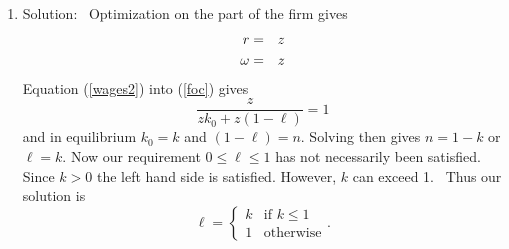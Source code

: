 \documentclass[11pt]{article}
\begin{document}
\begin{enumerate}
\begin{enumerate}
so 
\begin{eqnarray*}
\ell &=&\gamma \\
k &=&k_{0} \\
c &=&y=zk^{\gamma }n^{1-\gamma } \\
\omega &=&z\left( 1-\gamma \right) \left( \frac{k}{n}\right) ^{\gamma } \\
r &=&z\gamma \left( \frac{n}{k}\right) ^{1-\gamma }
\end{eqnarray*}%
There are a couple of things to notice. First, we have solved for every item
that the definition calls for. Second, in listing $\ell $ through $r$ we
have done it in such a way that the expressions include no terms that have
not previously been defined in terms of the model's parameters. Third, we
have one constraint that we have not yet dealt with, $0\leq \ell \leq 1.$
However since $0<\gamma <1$ this is satisfied. \ Finally, we are sloppy here
in that we ignore second or conditions. (Are these solutions maximums or
minimums?) You can always ignore second order conditions when not explicitly
asked for. However, be aware that they are required to actually be rigorous.

\item Solution: \ Optimization on the part of the firm gives 
\begin{eqnarray}
r &=&z  \label{wages2} \\
\omega &=&z  \notag
\end{eqnarray}%
Equation (\ref{wages2}) into (\ref{foc}) gives 
\begin{equation*}
\frac{z}{zk_{0}+z\left( 1-\ell \right) }=1
\end{equation*}%
and in equilibrium $k_{0}=k$ and $\left( 1-\ell \right) =n$. Solving then
gives $n=1-k$ or $\ell =k$. Now our requirement $0\leq \ell \leq 1$ has not
necessarily been satisfied. Since $k>0$ the left hand side is satisfied.
However, $k$ can exceed 1. \ Thus our solution is 
\begin{equation*}
\ell =\left\{ 
\begin{array}{cc}
k & \text{if }k\leq 1 \\ 
1 & \text{otherwise}%
\end{array}%
\right. .
\end{equation*}
\end{enumerate}
\end{enumerate}
\end{document}
